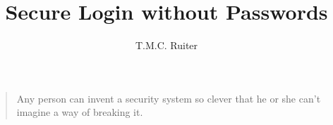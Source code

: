 \documentclass[a4paper]{article}%
\title{Secure Login without Passwords}
\author{T.M.C. Ruiter}
\begin{document}
\maketitle
\begin{quote}
Any person can invent a security system so clever that he or she can't imagine a way of breaking it.
\end{quote}

\newpage
\tableofcontents
\newpage









\end{document}
